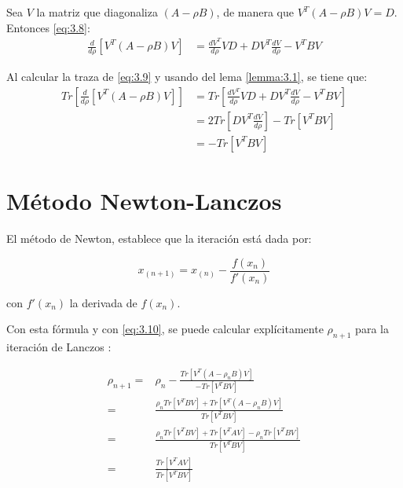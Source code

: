 Sea $V$ la matriz que diagonaliza $(A-\rho B)$, de manera que $V^T (A-\rho B) V = D$. Entonces \ref{eq:3.8}:
\begin{equation}\label{eq:3.9}
\begin{aligned}
\frac{d}{d\rho}\left[V^T (A-\rho B)V \right] & = \frac{dV^T}{d\rho} VD  + DV^T\frac{dV}{d\rho} - V^TBV 
\end{aligned}
\end{equation}

Al calcular la traza de \ref{eq:3.9} y usando del lema \ref{lemma:3.1}, se tiene que:
\begin{equation}\label{eq:3.10}
\begin{aligned}
Tr\left[\frac{d}{d\rho} \left[V^T (A-\rho B)V \right]\right] & = Tr\left[ \frac{dV^T}{d\rho} VD + DV^T \frac{dV}{d\rho} - V^T B V  \right] \\
											     & = 2 Tr \left[ D V^T \frac{dV}{d\rho} \right] - Tr \left[ V^T B V \right] \\
											     & = -Tr\left[V^T B V \right] 
\end{aligned}	
\end{equation}

\section{Método Newton-Lanczos}

El método de Newton, establece que la iteración está dada por:

\begin{equation*}
x_{(n+1)} = x_{(n)} - \frac{f(x_n)}{f'(x_n)}
\end{equation*}

con $f'(x_n)$ la derivada de $f(x_n)$.

Con esta fórmula y con \ref{eq:3.10}, se puede calcular explícitamente $\rho_{n+1}$ para la iteración de Lanczos \cite{ngo2012trace}:

\begin{equation}\label{eq:3.11}
\begin{aligned}
\rho_{n+1} =& \rho_{n} - \frac{Tr\left[V^T (A-\rho_n B)V \right]}{-Tr\left[V^T B V \right]} \\
           =& \frac{\rho_{n} Tr\left[V^T B V \right] +  Tr\left[V^T (A-\rho_n B)V \right]}{Tr\left[V^T B V \right]}\\
           =& \frac{\rho_{n} Tr\left[V^T B V \right] +  Tr\left[V^T A V \right] - \rho_nTr\left[V^T BV \right]}{Tr\left[V^T B V \right]} \\
           =&\frac{Tr\left[V^T A V \right]}{Tr\left[V^T B V \right]}
\end{aligned} 
\end{equation}

